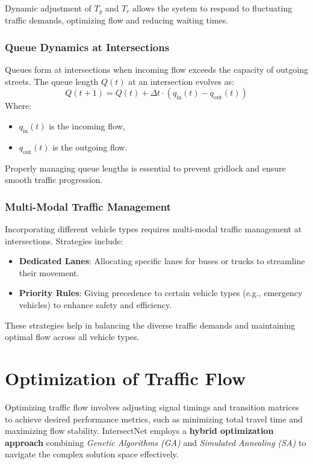 \documentclass[conference]{IEEEtran}
\begin{document}
Dynamic adjustment of $T_g$ and $T_r$ allows the system to respond to fluctuating traffic demands, optimizing flow and reducing waiting times.

\subsubsection{Queue Dynamics at Intersections}
Queues form at intersections when incoming flow exceeds the capacity of outgoing streets. The queue length $Q(t)$ at an intersection evolves as:
\[
Q(t+1) = Q(t) + \Delta t \cdot \left(q_{\text{in}}(t) - q_{\text{out}}(t)\right)
\]
Where:
\begin{itemize}
    \item $q_{\text{in}}(t)$ is the incoming flow,
    \item $q_{\text{out}}(t)$ is the outgoing flow.
\end{itemize}

Properly managing queue lengths is essential to prevent gridlock and ensure smooth traffic progression.

\subsubsection{Multi-Modal Traffic Management}
Incorporating different vehicle types requires multi-modal traffic management at intersections. Strategies include:
\begin{itemize}
    \item \textbf{Dedicated Lanes}: Allocating specific lanes for buses or trucks to streamline their movement.
    \item \textbf{Priority Rules}: Giving precedence to certain vehicle types (e.g., emergency vehicles) to enhance safety and efficiency.
\end{itemize}

These strategies help in balancing the diverse traffic demands and maintaining optimal flow across all vehicle types.

\section{Optimization of Traffic Flow}
Optimizing traffic flow involves adjusting signal timings and transition matrices to achieve desired performance metrics, such as minimizing total travel time and maximizing flow stability. IntersectNet employs a \textbf{hybrid optimization approach} combining \textit{Genetic Algorithms (GA)} and \textit{Simulated Annealing (SA)} to navigate the complex solution space effectively.
\end{document}
